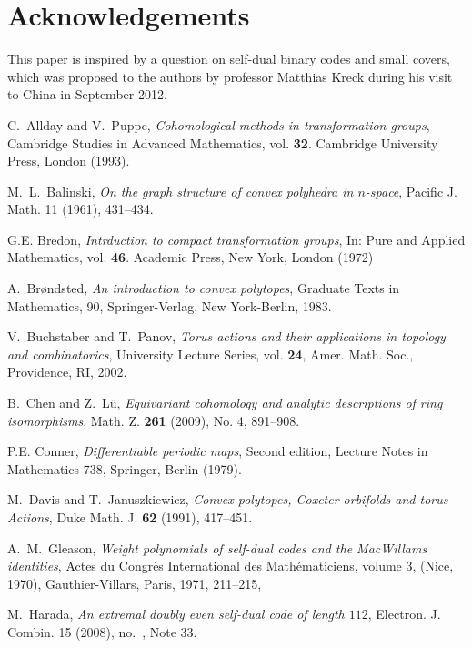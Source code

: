 \documentclass[12pt]{amsart}
\theoremstyle{plain} \numberwithin{equation}{section}
\theoremstyle{definition}
\theoremstyle{remark}
\begin{document}
\section*{Acknowledgements}
This paper is inspired by a question on 
self-dual binary codes and small covers, which was proposed to the authors 
by professor Matthias Kreck during his visit to China in September 2012.\\

\begin{thebibliography}{99}
C.~Allday and V.~Puppe, \emph{Cohomological methods in transformation
groups}, Cambridge Studies in Advanced Mathematics, vol. {\bf 32}.
Cambridge University Press, London (1993).

 M.~L.~Balinski, \emph{On the graph structure of convex polyhedra in $n$-space}, 
   Pacific J. Math. 11 (1961), 431--434.

 G.E. Bredon, \emph{Intrduction to compact transformation groups}, In: Pure and Applied Mathematics, vol.
{\bf 46}. Academic Press, New York, London (1972)

A.~Br{\o}ndsted, \emph{An introduction to convex polytopes}, Graduate Texts in Mathematics, 90,  
 Springer-Verlag, New York-Berlin, 1983. 

 V.~Buchstaber and T.~Panov,
  \emph{Torus
actions and their applications in topology and combinatorics},
 University Lecture Series, vol. {\bf 24}, Amer.
 Math. Soc., Providence, RI, 2002.

 B.~Chen and Z.~L\"{u},
  \emph{Equivariant cohomology and analytic descriptions of ring isomorphisms},
    Math. Z. {\bf 261} (2009), No. 4, 891--908.

 P.E. Conner, \emph{Differentiable periodic maps}, Second edition,
 Lecture Notes in Mathematics 738, Springer, Berlin (1979).
 
 M.~Davis and T.~Januszkiewicz,
 \emph{Convex polytopes, Coxeter orbifolds and torus Actions},
 Duke Math. J.  {\bf 62} (1991), 417--451.

 A.~M.~Gleason, \emph{Weight polynomials of self-dual codes and the MacWillams
identities}, Actes du Congr\`es International des Math\'ematiciens, volume 3,
 (Nice, 1970), Gauthier-Villars, Paris, 1971, 211--215,

M.~Harada, \emph{An extremal doubly even self-dual code of length $112$}, 
Electron. J. Combin. 15 (2008), no.~, Note 33.


\end{thebibliography}
\end{document}
